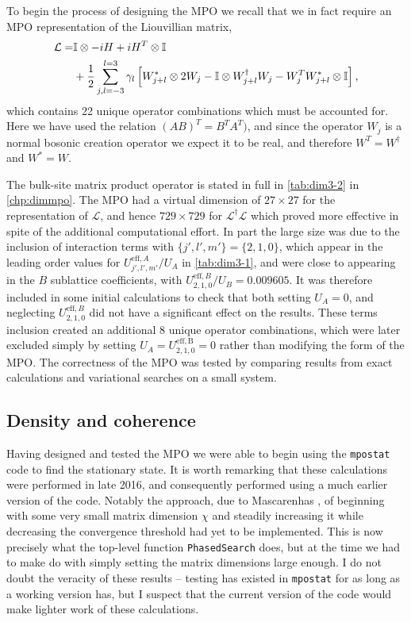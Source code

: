 To begin the process of designing the MPO we recall that we in fact require an MPO representation of the Liouvillian matrix,
\begin{align}
	\mathcal{L} = &\mathbb{I} \otimes -iH + iH^{T} \otimes \mathbb{I} \notag \\ 
	&+ \frac{1}{2}\sum_{j,l=-3}^{l=3}\gamma_{l}\left[ W_{j+l}^{*} \otimes 2W_{j} - \mathbb{I} \otimes W_{j+l}^{\dagger}W_{j} - W_{j}^{T}W_{j+l}^{*} \otimes \mathbb{I} \right],
	\label{eq:dim3-4}
\end{align}
which contains 22 unique operator combinations which must be accounted for. Here we have used the relation \((AB)^{T} = B^{T}A^{T})\), and since the operator \(W_{j}\) is a normal bosonic creation operator we expect it to be real, and therefore \(W^{T} = W^{\dagger}\) and \(W^{*} = W\).

The bulk-site matrix product operator is stated in full in \cref{tab:dim3-2} in \cref{chp:dimmpo}. The MPO had a virtual dimension of \(27 \times 27\) for the representation of \(\mathcal{L}\), and hence \(729 \times 729\) for \(\mathcal{L}^{\dagger}\mathcal{L}\) which proved more effective in spite of the additional computational effort. In part the large size was due to the inclusion of interaction terms with \(\{j',l',m'\} = \{2,1,0\}\), which appear in the leading order values for \(U^{\mathrm{eff},A}_{j',l',m'} / U_{A}\) in \cref{tab:dim3-1}, and were close to appearing in the \(B\) sublattice coefficients, with \(U^{\mathrm{eff},B}_{2,1,0} / U_{B} = 0.009605\). It was therefore included in some initial calculations to check that both setting \(U_{A} = 0\), and neglecting \(U^{\mathrm{eff},B}_{2,1,0}\) did not have a significant effect on the results. These terms inclusion created an additional 8 unique operator combinations, which were later excluded simply by setting \(U_{A} = U^{\mathrm{eff,B}}_{2,1,0} = 0\) rather than modifying the form of the MPO. The correctness of the MPO was tested by comparing results from exact calculations and variational searches on a small system.

\subsection{Density and coherence}
Having designed and tested the MPO we were able to begin using the \lstinline$mpostat$ code to find the stationary state. It is worth remarking that these calculations were performed in late 2016, and consequently performed using a much earlier version of the code. Notably the approach, due to Mascarenhas \cite{Mascarenhas2015}, of beginning with some very small matrix dimension \(\chi\) and steadily increasing it while decreasing the convergence threshold had yet to be implemented. This is now precisely what the top-level function \lstinline$PhasedSearch$ does, but at the time we had to make do with simply setting the matrix dimensions large enough. I do not doubt the veracity of these results -- testing has existed in \lstinline$mpostat$ for as long as a working version has, but I suspect that the current version of the code would make lighter work of these calculations.

